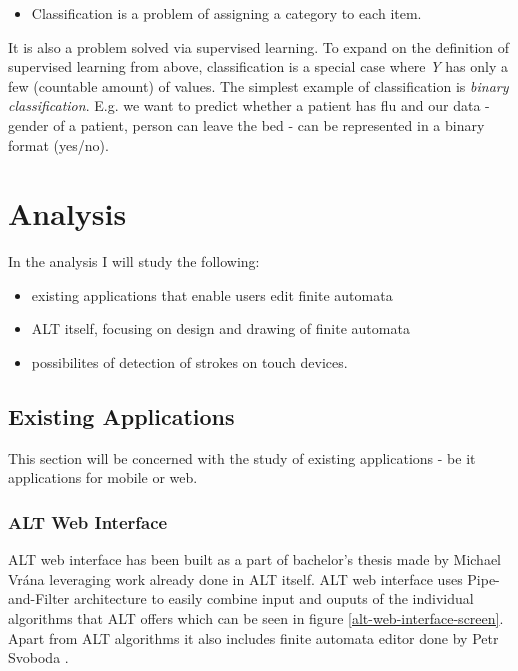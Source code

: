 \begin{itemize}
    \item Classification is a problem of assigning a category to each item.
\end{itemize}
It is also a problem solved via supervised learning. To expand on the definition of supervised learning from above, classification is a special case where \textit{Y} has only a few (countable amount) of values. The simplest example of classification is \textit{binary classification}. E.g. we want to predict whether a patient has flu and our data - gender of a patient, person can leave the bed - can be represented in a binary format (yes/no).

\chapter{Analysis}
\label{chap:analysis}

In the analysis I will study the following:
\begin{itemize}
    \item existing applications that enable users edit finite automata
    \item ALT itself, focusing on design and drawing of finite automata
    \item possibilites of detection of strokes on touch devices.
\end{itemize}

\section{Existing Applications}

This section will be concerned with the study of existing applications - be it applications for mobile or web.

\subsection{ALT Web Interface}

ALT web interface has been built as a part of bachelor's thesis made by Michael Vrána \cite{web-alt} leveraging work already done in ALT itself. ALT web interface uses Pipe-and-Filter \cite{pipe-and-filter} architecture to easily combine input and ouputs of the individual algorithms that ALT offers which can be seen in figure \ref{alt-web-interface-screen}. Apart from ALT algorithms it also includes finite automata editor done by Petr Svoboda \cite{state-maker}.

